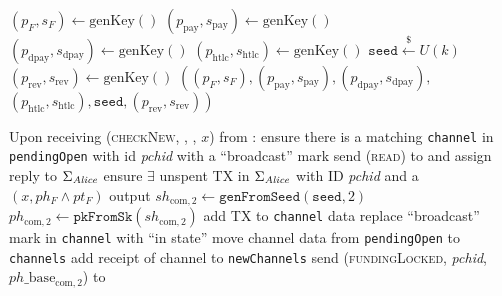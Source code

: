 \begin{algorithmic}[1]
     
      \State $\left(p_F, s_F\right) \gets \mathrm{genKey}\left(\right)$
      \State $\left(p_{\mathrm{pay}}, s_{\mathrm{pay}}\right) \gets
      \mathrm{genKey}\left(\right)$ 
      \State $\left(p_{\mathrm{dpay}}, s_{\mathrm{dpay}}\right) \gets
      \mathrm{genKey}\left(\right)$ 
      \State $\left(p_{\mathrm{htlc}}, s_{\mathrm{htlc}}\right) \gets
      \mathrm{genKey}\left(\right)$ 
      \State $\texttt{seed} \overset{\$}{\gets} U(k)$ 
      \State $\left(p_{\mathrm{rev}}, s_{\mathrm{rev}}\right) \gets
      \mathrm{genKey}\left(\right)$ 
      \State \Return $\left(\left(p_F, s_F\right), \left(p_{\mathrm{pay}},
      s_{\mathrm{pay}}\right), \left(p_{\mathrm{dpay}},
      s_{\mathrm{dpay}}\right),\right.$
      \Indent
        \State $\left.\left(p_{\mathrm{htlc}}, s_{\mathrm{htlc}}\right),
        \mathtt{seed}, \left(p_{\mathrm{rev}}, s_{\mathrm{rev}}\right)\right)$
      \EndIndent
    \EndFunction
    \State

    \State {}
    \State Upon receiving (\textsc{checkNew}, \alice, \bob, $x$) from
    \environment: 
    \Indent
      \State ensure there is a matching \texttt{channel} in \texttt{pendingOpen}
      with id \textit{pchid} with a ``broadcast'' mark
      \State send (\textsc{read}) to \ledger{} and assign reply to
      $\Sigma_{\mathit{Alice}}$
      \State ensure $\exists$ unspent TX in $\Sigma_{\mathit{Alice}}$ with ID
      \textit{pchid} and a $\left(x, ph_F \wedge pt_F\right)$ output
      \State $sh_{\mathrm{com}, 2} \gets
      \texttt{genFromSeed}\left(\mathtt{seed}, 2\right)$
      \State $ph_{\mathrm{com}, 2} \gets
      \mathtt{pkFromSk}\left(sh_{\mathrm{com}, 2}\right)$
      \State add TX to \texttt{channel} data \State replace ``broadcast'' mark
      in \texttt{channel} with ``in state''
        \State move channel data from \texttt{pendingOpen} to \texttt{channels}
        \State add receipt of channel to \texttt{newChannels}
      \EndIf
      \State send (\textsc{fundingLocked}, \textit{pchid},
      $ph\_\mathrm{base}_{\mathrm{com}, 2}$) to \bob{}
    \EndIndent
    \State


\end{algorithmic}
